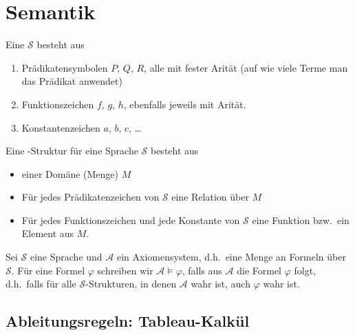 \documentclass[ngerman]{scrartcl}
\begin{document}
\section{Semantik}

\begin{definition}[Sprache]
  Eine  $\mathcal{S}$ besteht aus
  \begin{enumerate}[1.]
    \item Prädikatensymbolen $P$, $Q$, $R$, alle mit fester Arität (auf wie viele Terme man das Prädikat anwendet)
    \item Funktionszeichen $f$, $g$, $h$, ebenfalls jeweils mit Arität.
    \item Konstantenzeichen $a$, $b$, $c$, \ldots
  \end{enumerate}
\end{definition}

\begin{definition}[S-Struktur]
  Eine -Struktur für eine Sprache $\mathcal{S}$ besteht aus
  \begin{itemize}
    \item einer Domäne (Menge) $M$
    \item Für jedes Prädikatenzeichen von $\mathcal{S}$ eine Relation über $M$
    \item Für jedes Funktionszeichen und jede Konstante von $\mathcal{S}$ eine Funktion bzw.~ein Element aus $M$.
  \end{itemize}
\end{definition}

\begin{definition}
  Sei $\mathcal{S}$ eine Sprache und $\mathcal{A}$ ein Axiomensystem, d.h.~eine Menge an Formeln über $\mathcal{S}$.
 Für eine Formel $\varphi $ schreiben wir $\mathcal{A} \models \varphi $,
 falls aus $\mathcal{A}$  die Formel $\varphi $ folgt,
 d.h.~falls für alle $\mathcal{S}$-Strukturen, in denen $\mathcal{A}$ wahr ist,
 auch $\varphi $ wahr ist.
\end{definition}


\subsection{Ableitungsregeln: Tableau-Kalkül}
\end{document}
